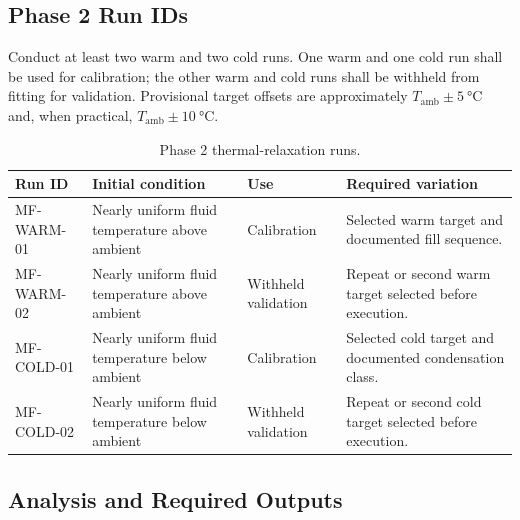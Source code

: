 \documentclass[11pt]{article}
\newcommand{\Tamb}{T_{\mathrm{amb}}}
\begin{document}
\subsection{Phase 2 Run IDs}

Conduct at least two warm and two cold runs. One warm and one cold run shall be used for calibration; the other warm and cold runs shall be withheld from fitting for validation. Provisional target offsets are approximately $\Tamb\pm\SI{5}{\degreeCelsius}$ and, when practical, $\Tamb\pm\SI{10}{\degreeCelsius}$.

\begin{table}[htbp]
    \centering
    \caption{Phase 2 thermal-relaxation runs.}
    \label{tab:phase2_relaxation_runs}
    \begin{tabularx}{\textwidth}{
        @{}
        >{\raggedright\arraybackslash}p{1.25in}
        >{\raggedright\arraybackslash}p{1.75in}
        >{\raggedright\arraybackslash}p{1.35in}
        >{\raggedright\arraybackslash}X
        @{}
    }
        \toprule
        \textbf{Run ID} &
        \textbf{Initial condition} &
        \textbf{Use} &
        \textbf{Required variation} \\
        \midrule

        MF-WARM-01 &
        Nearly uniform fluid temperature above ambient &
        Calibration &
        Selected warm target and documented fill sequence. \\

        MF-WARM-02 &
        Nearly uniform fluid temperature above ambient &
        Withheld validation &
        Repeat or second warm target selected before execution. \\

        MF-COLD-01 &
        Nearly uniform fluid temperature below ambient &
        Calibration &
        Selected cold target and documented condensation class. \\

        MF-COLD-02 &
        Nearly uniform fluid temperature below ambient &
        Withheld validation &
        Repeat or second cold target selected before execution. \\

        \bottomrule
    \end{tabularx}
\end{table}

\subsection{Analysis and Required Outputs}
\end{document}
